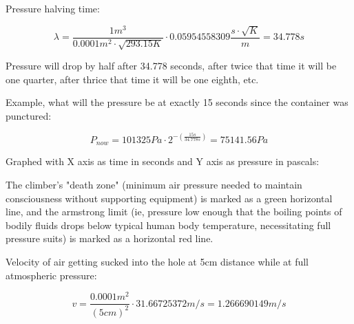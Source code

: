 \documentclass[a4paper]{article}
\begin{document}
	Pressure halving time:
	
	$$ \lambda = \frac{1m^3}{0.0001m^2 \cdot \sqrt{293.15 K}} \cdot 0.05954558309\frac{s \cdot \sqrt{K}}{m} = 34.778s $$
	
	Pressure will drop by half after 34.778 seconds, after twice that time it will be one quarter, after thrice that time it will be one eighth, etc.
	
	Example, what will the pressure be at exactly 15 seconds since the container was punctured:
	
	$$ P_{now} = 101325Pa \cdot 2^{-(\frac{15s}{34.778s})} = 75141.56 Pa $$
	
	\begin{center}
		Graphed with X axis as time in seconds and Y axis as pressure in pascals:
		
	\end{center}
	
	The climber's "death zone" (minimum air pressure needed to maintain consciousness without supporting equipment) is marked as a green horizontal line, and the armstrong limit (ie, pressure low enough that the boiling points of bodily fluids drops below typical human body temperature, necessitating full pressure suits) is marked as a horizontal red line.
	
	\medskip
	
	Velocity of air getting sucked into the hole at 5cm distance while at full atmospheric pressure:
	
	$$ v = \frac{0.0001m^2}{(5cm)^2} \cdot 31.66725372m/s = 1.266690149 m/s $$
	
\end{document}
